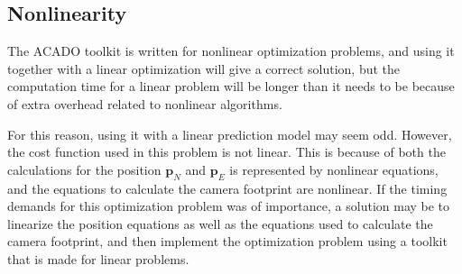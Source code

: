\subsection{Nonlinearity}

The ACADO toolkit is written for nonlinear optimization problems, and using it together with a linear optimization will give a correct solution, but the computation time for a linear problem will be longer than it needs to be because of extra overhead related to nonlinear algorithms.

For this reason, using it with a linear prediction model may seem odd. However, the cost function used in this problem is not linear. This is because of both the calculations for the position $\mathbf{p}_N$ and $\mathbf{p}_E$ is represented by nonlinear equations, and the equations to calculate the camera footprint are nonlinear. If the timing demands for this optimization problem was of importance, a solution may be to linearize the position equations as well as the equations used to calculate the camera footprint, and then implement the optimization problem using a toolkit that is made for linear problems.